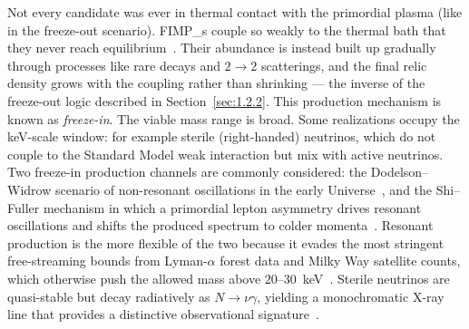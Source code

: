 Not every candidate was ever in thermal contact with the primordial plasma (like in the freeze-out scenario).
\Glspl{FIMP_} couple so weakly to the thermal bath that they never reach equilibrium~\cite{Hall:2009bx}.
Their abundance is instead built up gradually through processes like rare decays and $2 \to 2$ scatterings, and the final relic density grows with the coupling rather than shrinking --- the inverse of the freeze-out logic described in Section~\ref{sec:1.2.2}.
This production mechanism is known as \emph{freeze-in}.
The viable \FIMP mass range is broad. Some realizations occupy the keV-scale window: for example sterile (right-handed) neutrinos, which do not couple to the Standard Model weak interaction but mix with active neutrinos.
Two freeze-in production channels are commonly considered: the Dodelson--Widrow scenario of non-resonant oscillations in the early Universe~\cite{Dodelson:1993je}, and the Shi--Fuller mechanism in which a primordial lepton asymmetry drives resonant oscillations and shifts the produced spectrum to colder momenta~\cite{Shi:1998km}.
Resonant production is the more flexible of the two because it evades the most stringent free-streaming bounds from Lyman-$\alpha$ forest data and Milky Way satellite counts, which otherwise push the allowed mass above $20$--$30$~keV~\cite{Boyarsky:2018tvu}.
Sterile neutrinos are quasi-stable but decay radiatively as $N \to \nu\gamma$, yielding a monochromatic X-ray line that provides a distinctive observational signature~\cite{Boyarsky:2018tvu,Drewes:2016upu}.



